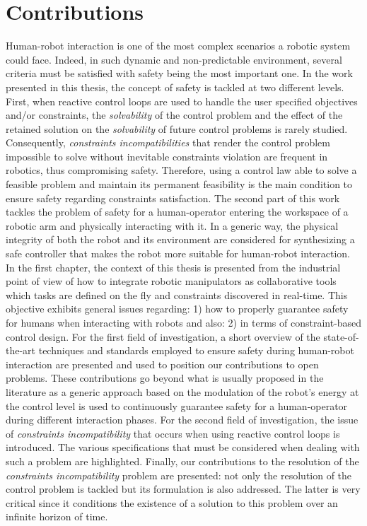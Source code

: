 \section{Contributions}
Human-robot interaction is one of the most complex scenarios a robotic system could face. Indeed, in such dynamic and non-predictable environment, several criteria must be satisfied with safety being the most important one. In the work presented in this thesis, the concept of safety is tackled at two different levels. First, when reactive control loops are used to handle the user specified objectives and/or constraints, the \textit{solvability} of the control problem and the effect of the retained solution on the \textit{solvability} of future control problems is rarely studied. Consequently, \textit{constraints incompatibilities} that render the control problem impossible to solve without inevitable constraints violation are frequent in robotics, thus compromising safety. Therefore, using a control law able to solve a feasible problem and maintain its permanent feasibility is the main condition to ensure safety regarding constraints satisfaction. The second part of this work tackles the problem of safety for a human-operator entering the workspace of a robotic arm and physically interacting with it. In a generic way, the physical integrity of both the robot and its environment are considered for synthesizing a safe controller that makes the robot more suitable for human-robot interaction.  \\

In the first chapter, the context of this thesis is presented from the industrial point of view of how to integrate robotic manipulators as collaborative tools which tasks are defined on the fly and constraints discovered in real-time. This objective exhibits general issues regarding: 1) how to properly guarantee safety for humans when interacting with robots and also: 2) in terms of constraint-based control design. For the first field of investigation, a short overview of the state-of-the-art techniques and standards employed to ensure safety during human-robot interaction are presented and used to position our contributions to open problems. These contributions go beyond what is usually proposed in the literature as a generic approach based on the modulation of the robot's energy at the control level is used to continuously guarantee safety for a human-operator during different interaction phases. For the second field of investigation, the issue of \textit{constraints incompatibility} that occurs when using reactive control loops is introduced. The various specifications that must be considered when dealing with such a problem are highlighted. Finally, our contributions to the resolution of the \textit{constraints incompatibility} problem are presented: not only the resolution of the control problem is tackled but its formulation is also addressed. The latter is very critical since it conditions the existence of a solution to this problem over an infinite horizon of time.

